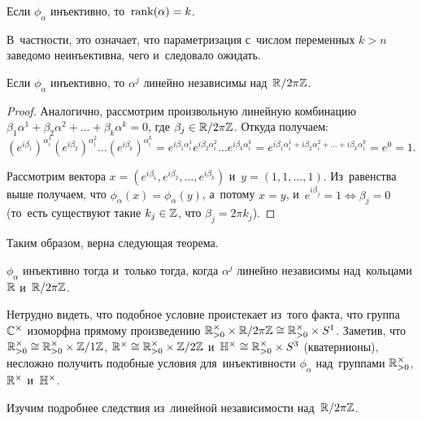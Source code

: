 \documentclass{article}
\begin{document}
\begin{consequence*}
    Если $\phi_\alpha$ инъективно, то~$\mathrm{rank}(\alpha) = k$.
\end{consequence*}

В~частности, это означает, что параметризация с~числом переменных $k > n$ заведомо неинъективна, чего и~следовало ожидать.

\begin{lemma*}
    Если $\phi_\alpha$ инъективно, то $\alpha^j$ линейно независимы над~$\mathbb{R} / 2 \pi \mathbb{Z}$.
\end{lemma*}

\begin{proof}
    Аналогично, рассмотрим произвольную линейную комбинацию $\beta_1 \alpha^1 + \beta_2 \alpha^2 + \ldots + \beta_k \alpha^k = 0$,
    где $\beta_j \in \mathbb{R} / 2 \pi \mathbb{Z}$. Откуда получаем:
    $$
        (e^{i\beta_1})^{\alpha_i^1} (e^{i\beta_2})^{\alpha_i^2} \ldots (e^{i\beta_k})^{\alpha_i^k} =
        e^{i\beta_1 \alpha_i^1} e^{i\beta_2 \alpha_i^2} \ldots e^{i\beta_k \alpha_i^k} =
        e^{i\beta_1 \alpha_i^1 + i\beta_2 \alpha_i^2 + \ldots + i\beta_k \alpha_i^k} =
        e^0 = 1.
    $$

    Рассмотрим вектора $x = (e^{i\beta_1}, e^{i\beta_2}, \ldots, e^{i\beta_k})$ и~$y = (1, 1, \ldots, 1)$.
    Из~равенства выше получаем, что $\phi_\alpha(x) = \phi_\alpha(y)$, а~потому $x = y$, и~$e^{i\beta_j} = 1 \Leftrightarrow \beta_j = 0$
    (то~есть существуют такие $k_j \in \mathbb{Z}$, что $\beta_j = 2 \pi k_j$).
\end{proof}

Таким образом, верна следующая теорема.

\begin{theorem*}
    $\phi_\alpha$ инъективно тогда и~только тогда, когда $\alpha^j$ линейно независимы над~кольцами $\mathbb{R}$ и~$\mathbb{R} / 2 \pi \mathbb{Z}$.
\end{theorem*}

Нетрудно видеть, что подобное условие проистекает из~того факта, что группа $\mathbb{C}^\times$ изоморфна прямому произведению
$\mathbb{R}_{>0}^\times \times \mathbb{R} / 2 \pi \mathbb{Z} \cong \mathbb{R}_{>0}^\times \times S^1$. Заметив, что $\mathbb{R}_{>0}^\times \cong \mathbb{R}_{>0}^\times \times \mathbb{Z} / 1\mathbb{Z}$,
$\mathbb{R}^\times \cong \mathbb{R}_{>0}^\times \times \mathbb{Z} / 2 \mathbb{Z}$ и~$\mathbb{H}^\times \cong \mathbb{R}_{>0}^\times \times S^3$ (кватернионы), несложно получить
подобные условия для~инъективности $\phi_\alpha$ над~группами $\mathbb{R}_{>0}^\times$, $\mathbb{R}^\times$ и~$\mathbb{H}^\times$.

Изучим подробнее следствия из~линейной независимости над~$\mathbb{R} / 2 \pi \mathbb{Z}$.
\end{document}
